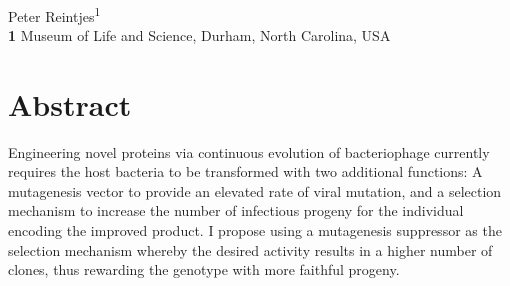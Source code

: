 \documentclass[10pt,letterpaper]{article}
\date{}
\begin{document}
\vspace*{0.2in}

\begin{flushleft}
{\Large
\textbf{} %
}
\newline
\\
Peter Reintjes\textsuperscript{1}
\\
\bigskip
\textbf{1} Museum of Life and Science, Durham, North Carolina, USA
\bigskip

% 
%






\end{flushleft}
\section*{Abstract}
Engineering novel proteins via continuous evolution of bacteriophage currently requires the host bacteria to be transformed with two additional functions: A mutagenesis vector to provide an elevated rate of viral mutation, and a selection mechanism to increase the number of infectious progeny for the individual encoding the improved product\cite{pace}.  I propose using a mutagenesis suppressor as the selection mechanism whereby the desired activity results in a higher number of clones, thus rewarding the genotype with more faithful progeny.
\end{document}
